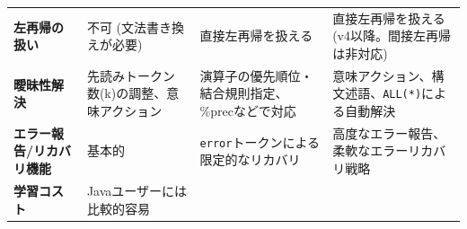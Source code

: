 \begin{longtable}[]{@{}llll@{}}
\begin{minipage}[t]{0.14\columnwidth}
\textbf{左再帰の扱い}\strut
\end{minipage} & \begin{minipage}[t]{0.20\columnwidth}\raggedright
不可 (文法書き換えが必要)\strut
\end{minipage} & \begin{minipage}[t]{0.22\columnwidth}\raggedright
直接左再帰を扱える\strut
\end{minipage} & \begin{minipage}[t]{0.32\columnwidth}\raggedright
直接左再帰を扱える (v4以降。間接左再帰は非対応)\strut
\end{minipage}\tabularnewline
\begin{minipage}[t]{0.14\columnwidth}\raggedright
\textbf{曖昧性解決}\strut
\end{minipage} & \begin{minipage}[t]{0.20\columnwidth}\raggedright
先読みトークン数(k)の調整、意味アクション\strut
\end{minipage} & \begin{minipage}[t]{0.22\columnwidth}\raggedright
演算子の優先順位・結合規則指定、\%precなどで対応\strut
\end{minipage} & \begin{minipage}[t]{0.32\columnwidth}\raggedright
意味アクション、構文述語、\texttt{ALL(*)}による自動解決\strut
\end{minipage}\tabularnewline
\begin{minipage}[t]{0.14\columnwidth}\raggedright
\textbf{エラー報告/リカバリ機能}\strut
\end{minipage} & \begin{minipage}[t]{0.20\columnwidth}\raggedright
基本的\strut
\end{minipage} & \begin{minipage}[t]{0.22\columnwidth}\raggedright
\texttt{error}トークンによる限定的なリカバリ\strut
\end{minipage} & \begin{minipage}[t]{0.32\columnwidth}\raggedright
高度なエラー報告、柔軟なエラーリカバリ戦略\strut
\end{minipage}\tabularnewline
\begin{minipage}[t]{0.14\columnwidth}\raggedright
\textbf{学習コスト}\strut
\end{minipage} & \begin{minipage}[t]{0.20\columnwidth}\raggedright
Javaユーザーには比較的容易\strut
\end{minipage} & \begin{minipage}[t]{0.22\columnwidth}\raggedright

\end{minipage}
\end{longtable}
